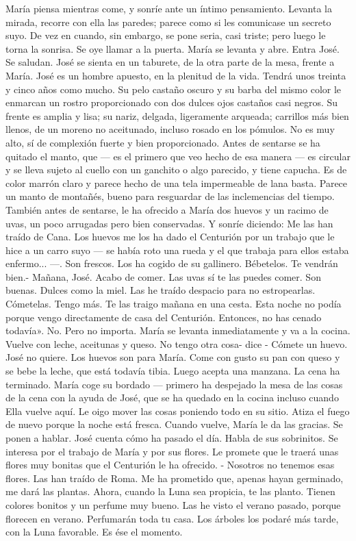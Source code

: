 \documentclass[12pt]{book} %
\begin{document}
María piensa mientras come, y sonríe ante un íntimo pensamiento. Levanta la mirada, recorre con ella las paredes; 
parece como si les comunicase un secreto suyo. De vez en cuando, sin embargo, se pone seria, casi triste; pero luego le torna la sonrisa. 
Se oye llamar a la puerta. María se levanta y abre. Entra José. Se saludan. José se sienta en un taburete, de la otra parte 
de la mesa, frente a María. 
José es un hombre apuesto, en la plenitud de la vida. Tendrá unos treinta y cinco años como mucho. Su pelo castaño oscuro y su barba del mismo color le enmarcan un rostro proporcionado con dos dulces ojos castaños casi negros. Su frente es amplia y lisa; su nariz, delgada, ligeramente arqueada; carrillos más bien llenos, de un moreno no aceitunado, incluso rosado en los pómulos. No es muy alto, sí de complexión fuerte y bien proporcionado. 
Antes de sentarse se ha quitado el manto, que — es el primero que veo hecho de esa manera — es circular y se lleva sujeto al cuello con un ganchito o algo parecido, y tiene capucha. Es de color marrón claro y parece hecho de una tela impermeable de lana basta. Parece un manto de montañés, bueno para resguardar de las inclemencias del tiempo. 
También antes de sentarse, le ha ofrecido a María dos huevos y un racimo de uvas, un poco arrugadas pero bien 
conservadas. Y sonríe diciendo: 
Me las han traído de Cana. Los huevos me los ha dado el Centurión por un trabajo que le hice a un carro suyo — se 
había roto una rueda y el que trabaja para ellos estaba enfermo... —. Son frescos. Los ha cogido de su gallinero. Bébetelos. Te vendrán bien.- 
Mañana, José. Acabo de comer. 
Las uvas sí te las puedes comer. Son buenas. Dulces como la miel. Las he traído despacio para no estropearlas. Cómetelas. Tengo más. Te las traigo mañana en una cesta. Esta noche no podía porque vengo directamente de casa del Centurión. 
Entonces, no has cenado todavía». 
No. Pero no importa. 
María se levanta inmediatamente y va a la cocina. Vuelve con leche, aceitunas y queso. 
No tengo otra cosa- dice - Cómete un huevo. 
José no quiere. Los huevos son para María. Come con gusto su pan con queso y se bebe la leche, que está todavía tibia. Luego acepta una manzana. La cena ha terminado. 
María coge su bordado — primero ha despejado la mesa de las cosas de la cena con la ayuda de José, que se ha 
quedado en la cocina incluso cuando Ella vuelve aquí. Le oigo mover las cosas poniendo todo en su sitio. Atiza el fuego de nuevo porque la noche está fresca. Cuando vuelve, María le da las gracias. 
Se ponen a hablar. José cuenta cómo ha pasado el día. Habla de sus sobrinitos. Se interesa por el trabajo de María y por sus flores. Le promete que le traerá unas flores muy bonitas que el Centurión le ha ofrecido. - Nosotros no tenemos esas flores. Las han traído de Roma. Me ha prometido que, apenas hayan germinado, me dará las plantas. Ahora, cuando la Luna sea propicia, te las planto. Tienen colores bonitos y un perfume muy bueno. Las he visto el verano pasado, porque florecen en verano. Perfumarán toda tu casa. Los árboles los podaré más tarde, con la Luna favorable. Es ése el momento. 
\end{document}
